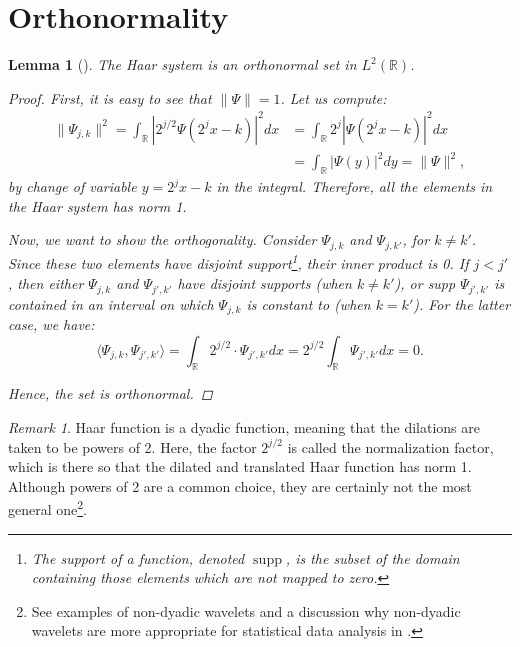 \documentclass[11pt]{amsart}
\theoremstyle{theorem} %
\newtheorem{lem}[thm]{Lemma} %
\theoremstyle{definition}
\theoremstyle{example}
\theoremstyle{remark}
\newtheorem{rem}[thm]{Remark}
\numberwithin{equation}{section}
\newcommand{\R}{\mathbb{R}}
\DeclareMathOperator*{\supp}{supp}
\begin{document}
\section{Orthonormality} \label{section:orthonormality}
\begin{lem}[{\cite[409]{davidson}}] \label{lem:orthonormal}
	The Haar system is an orthonormal set in $ L^2(\R) $.
	
	\begin{proof}
		First, it is easy to see that $ \| \varPsi \| = 1 $. Let us compute:
		\begin{align*}
		\| \varPsi_{j,k} \|^2 = \int_{\R} \left| 2^{j/2} \varPsi(2^{j} x - k) \right|^2 dx 
		&=   \int_{\R} 2^j \left| \varPsi(2^{j} x - k) \right|^2 dx \\
		&= \int_{\R} \left| \varPsi(y) \right|^2 dy
		= \| \varPsi \|^2,
		\end{align*}
		by change of variable $ y = 2^{j}x-k $ in the integral. Therefore, all the elements in the Haar system has norm 1.
		
		Now, we want to show the orthogonality. Consider $ \varPsi_{j,k} $ and $ \varPsi_{j,k'} $, for $ k \neq k' $. Since these two elements have disjoint support\footnote{The \emph{support} of a function, denoted $ \supp $, is the subset of the domain containing those elements which are not mapped to zero.}, their inner product is 0. If $ j < j' $, then either $ \varPsi_{j,k} $ and $ \varPsi_{j',k'} $ have disjoint supports (when $ k \neq k' $), or supp $ \varPsi_{j',k'} $ is contained in an interval on which $ \varPsi_{j,k} $ is constant to (when $ k = k' $). For the latter case, we have:
		\[ \langle \varPsi_{j,k}, \varPsi_{j',k'} \rangle =  \int_{\R} 2^{j/2} \cdot \varPsi_{j',k'} dx = 2^{j/2} \int_{\R} \varPsi_{j',k'} dx = 0. \]
	
		Hence, the set is orthonormal.
	\end{proof}
\end{lem}

\begin{rem}
	Haar function is a dyadic function, meaning that the dilations are taken to be powers of 2. Here, the factor $ 2^{j/2} $ is called the normalization factor, which is there so that the dilated and translated Haar function has norm 1. Although powers of 2 are a common choice, they are certainly not the most general one\footnote{See examples of non-dyadic wavelets and a discussion why non-dyadic wavelets are more appropriate for statistical data analysis in \cite{pollock}.}.
\end{rem}
\end{document}
